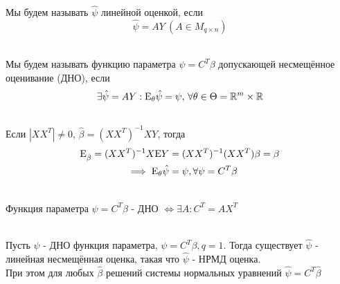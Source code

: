 \documentclass[main.tex]{subfiles}
\begin{document}
\begin{definition} ~\\
	Мы будем называть $\hat \psi$ линейной оценкой, если
	\[\hat\psi = AY\ (A \in M_{q \times n})\]
\end{definition}
\begin{definition} ~\\
	Мы будем называть функцию параметра $\psi = C^T\beta$ допускающей несмещённое оценивание (ДНО), если
	\[\exists \hat \psi = AY: \mathrm{E}_\theta \hat \psi = \psi,\,\forall \theta \in \Theta = \mathbb{R}^m \times \mathbb{R}\]
\end{definition}
\begin{example} ~\\
	Если $|XX^T| \neq 0$, $\hat\beta = (XX^T)^{-1}XY$, тогда
	\begin{align*}
		\mathrm{E}_{\hat\beta} = (XX^T)^{-1}X\mathrm{E} Y &= (XX^T)^{-1}(XX^T)\beta = \beta\\
		\implies \mathrm{E}_\theta\hat\psi &= \psi, \forall\psi = C^T\beta
	\end{align*}
\end{example}
\begin{statement} ~\\
	Функция параметра $\psi = C^T\beta$ - ДНО $\iff \exists A: C^T = AX^T$
\end{statement}
\begin{theorem} ~\\
	Пусть $\psi$ - ДНО функция параметра, $\psi = C^T\beta, q = 1$. Тогда существует $\hat\psi$ - линейная несмещённая оценка, такая что $\hat\psi$ - НРМД оценка.\\
	При этом для любых $\hat\beta$ решений системы нормальных уравнений $\hat\psi=C^T\hat\beta$
\end{theorem}
\end{document}
